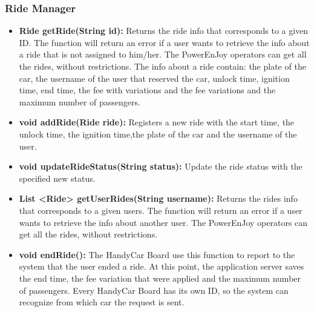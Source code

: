 \subsubsection{Ride Manager}
\begin{itemize}
	\item \textbf{Ride getRide(String id):} Returns the ride info that corresponds to a given ID. The function will return an error if a user wants to retrieve the info about a ride that is not assigned to him/her.
	The PowerEnJoy operators can get all the rides, without restrictions.
	The info about a ride contain: the plate of the car, the username of the user that reserved the car, unlock time, ignition time, end time, the fee with variations and the fee variations and the maximum number of passengers.
	\item \textbf{void addRide(Ride ride):} Registers a new ride with the start time, the unlock time, the ignition time,the plate of the car and the username of the user.
	\item \textbf{void updateRideStatus(String status):} Update the ride status with the specified new status.
	\item \textbf{List \textless Ride\textgreater{} getUserRides(String username):} Returns the rides info that corresponds to a given users. The function will return an error if a user wants to retrieve the info about another user.
	The PowerEnJoy operators can get all the rides, without restrictions.
	\item \textbf{void endRide():} The HandyCar Board use this function to report to the system that the user ended a ride. At this point, the application server saves the end time, the fee variation that were applied and the maximum number of passengers. Every HandyCar Board has its own ID, so the system can recognize from which car the request is sent.
\end{itemize}

